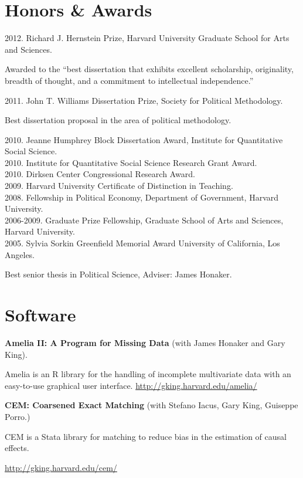 \documentclass[margin,line]{res}
\newenvironment{list1}{
  \begin{list}{\ding{113}}{%
      \setlength{\itemsep}{0in}
      \setlength{\parsep}{0in} \setlength{\parskip}{0in}
      \setlength{\topsep}{0in} \setlength{\partopsep}{0in} 
      \setlength{\leftmargin}{0.83 cm}}}{\end{list}}
\begin{document}
\begin{resume}
\section{\sc Honors \& Awards}
2012. Richard J. Hernstein Prize, Harvard University Graduate School
for Arts and Sciences.
\begin{list1}
\item[] Awarded to the ``best dissertation that exhibits excellent scholarship, originality, breadth of 
thought, and a commitment to intellectual independence.''
\end{list1}
\vspace{-1em}
2011. John T. Williams Dissertation Prize, Society for Political Methodology.
\begin{list1} 
\item[] Best dissertation proposal in the area of political methodology.
\end{list1}
\vspace{-1em}
2010. Jeanne Humphrey Block Dissertation Award, Institute for Quantitative Social Science. \\
2010. Institute for Quantitative Social Science Research Grant Award.\\
2010. Dirksen Center Congressional Research Award.\\
2009. Harvard University Certificate of Distinction in Teaching. \\
2008. Fellowship in Political Economy, Department of Government, Harvard
University.\\
2006-2009. Graduate Prize Fellowship, Graduate School of Arts and Sciences, Harvard
University.\\
2005. Sylvia Sorkin Greenfield Memorial Award University of California, Los Angeles.
\begin{list1} 
\item[] Best senior thesis in Political Science, Adviser: James Honaker.
\end{list1}



\section{\sc Software}
{\bf Amelia II: A Program for Missing Data} (with James Honaker and Gary
King). 
\begin{list1}
\item[] Amelia is an R library for the handling of incomplete multivariate
  data with an easy-to-use graphical user
  interface. \url{http://gking.harvard.edu/amelia/} 
\end{list1}
{\bf CEM: Coarsened Exact Matching} (with Stefano Iacus, Gary
King, Guiseppe  Porro.)
\begin{list1}
\item[] CEM is a Stata library for matching to reduce bias in the estimation of
  causal effects. 
\item[] \url{http://gking.harvard.edu/cem/}
\end{list1}


\end{resume}
\end{document}
